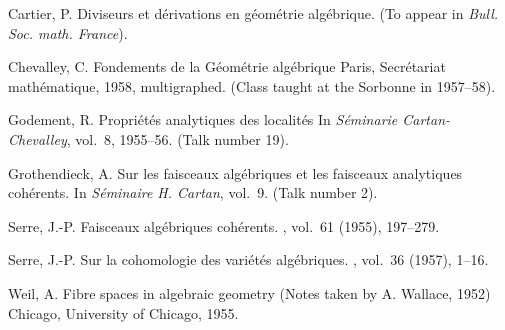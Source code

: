 \documentclass{article}
\theoremstyle{plain}
\theoremstyle{definition}
\begin{document}

\nocite{*}


\begin{thebibliography}{10}

  {\sc Cartier, P.}
  \newblock Diviseurs et d\'{e}rivations en g\'{e}om\'{e}trie alg\'{e}brique.
  \newblock (To appear in {\em Bull. Soc. math. France}).

  {\sc Chevalley, C.}
  \newblock Fondements de la G\'{e}om\'{e}trie alg\'{e}brique
  \newblock Paris, Secr\'{e}tariat math\'{e}matique, 1958, multigraphed.
  \newblock (Class taught at the Sorbonne in 1957--58).

  {\sc Godement, R.}
  \newblock Propri\'{e}t\'{e}s analytiques des localit\'{e}s
  \newblock In {\em S\'{e}minarie Cartan-Chevalley}, vol.~8, 1955--56.
  \newblock (Talk number 19).

  {\sc Grothendieck, A.}
  \newblock Sur les faisceaux alg\'{e}briques et les faisceaux analytiques
    coh\'{e}rents.
  \newblock In {\em S\'{e}minaire H. Cartan}, vol.~9.
  \newblock (Talk number 2).

  {\sc Serre, J.-P.}
  \newblock Faisceaux alg\'{e}briques coh\'{e}rents.
  , vol.~61 (1955), 197--279.

  {\sc Serre, J.-P.}
  \newblock Sur la cohomologie des vari\'{e}t\'{e}s alg\'{e}briques.
  , vol.~36 (1957), 1--16.

  {\sc Weil, A.}
  \newblock Fibre spaces in algebraic geometry
  \newblock (Notes taken by A. Wallace, 1952)
  \newblock Chicago, University of Chicago, 1955.

\end{thebibliography}
\end{document}
